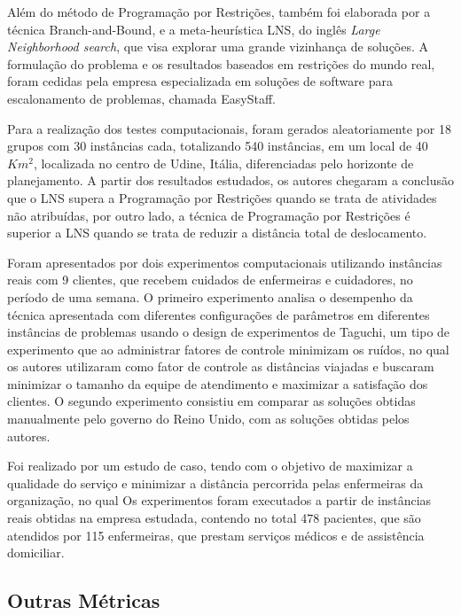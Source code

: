 Além do método de Programação por Restrições, também foi elaborada por  a técnica Branch-and-Bound, e a meta-heurística LNS, do inglês \textit{Large Neighborhood search}, que visa explorar uma grande vizinhança de soluções. A formulação do problema e os resultados baseados em restrições do mundo real, foram cedidas pela empresa especializada em soluções de software para escalonamento de problemas, chamada EasyStaff.

Para a realização dos testes computacionais, foram gerados aleatoriamente por  18 grupos com 30 instâncias cada, totalizando 540 instâncias, em um local de 40 $Km^{2}$, localizada no centro de Udine, Itália, diferenciadas pelo horizonte de planejamento. 
A partir dos resultados estudados, os autores chegaram a conclusão que o LNS supera a Programação por Restrições quando se trata de atividades não atribuídas, por outro lado, a técnica de Programação por Restrições é superior a LNS quando se trata de reduzir a distância total de deslocamento.


Foram apresentados por  dois experimentos computacionais utilizando instâncias reais com 9 clientes, que recebem cuidados de enfermeiras e cuidadores, no período de uma semana.
O primeiro experimento analisa o desempenho da técnica apresentada com diferentes configurações de parâmetros em diferentes instâncias de problemas usando o design de experimentos de Taguchi, um tipo de experimento que ao administrar fatores de controle minimizam os ruídos, no qual os autores utilizaram como fator de controle as distâncias viajadas e buscaram minimizar o tamanho da equipe de atendimento e maximizar a satisfação dos clientes. 
O segundo experimento consistiu em comparar as soluções obtidas manualmente pelo governo do Reino Unido, com as soluções obtidas pelos autores.

Foi realizado por  um estudo de caso, tendo com o objetivo de maximizar a qualidade do serviço e minimizar a distância percorrida pelas enfermeiras da organização, no qual Os experimentos foram executados a partir de instâncias reais obtidas na empresa estudada, contendo no total 478 pacientes,  que são atendidos por 115 enfermeiras, que prestam serviços médicos e de assistência domiciliar.
 
\subsection{Outras Métricas}

